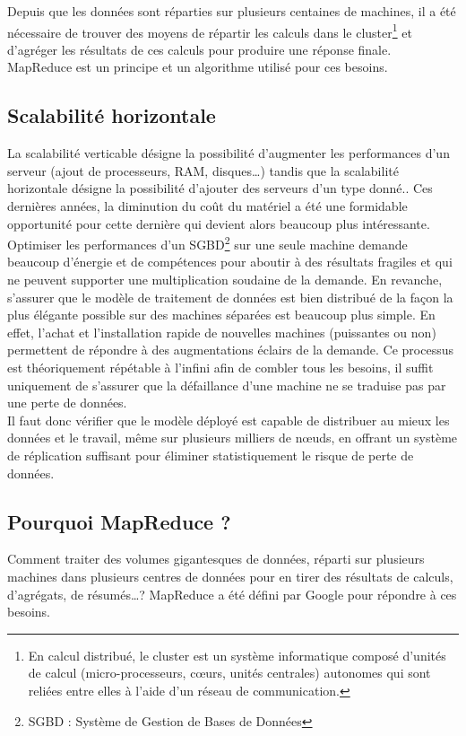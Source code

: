 Depuis que les données sont réparties sur plusieurs centaines de machines, il a été nécessaire de trouver des moyens de répartir les calculs dans le cluster\footnote{En calcul distribué, le cluster est un système informatique composé d'unités de calcul (micro-processeurs, cœurs, unités centrales) autonomes qui sont reliées entre elles à l'aide d'un réseau de communication.\cite{Wikipedia_cluster}} et d'agréger les résultats de ces calculs pour produire une réponse finale. MapReduce est un principe et un algorithme utilisé pour ces besoins.

\subsection*{Scalabilité horizontale}
	La scalabilité verticable désigne la possibilité d'augmenter les performances d'un serveur (ajout de processeurs, RAM, disques\dots) tandis que la scalabilité horizontale désigne la possibilité d'ajouter des serveurs d'un type donné.\cite{Wikipedia_scalabilite}. Ces dernières années, la diminution du coût du matériel a été une formidable opportunité pour cette dernière qui devient alors beaucoup plus intéressante.\\

	Optimiser les performances d'un SGBD\footnote{SGBD : Système de Gestion de Bases de Données} sur une seule machine demande beaucoup d'énergie et de compétences pour aboutir à des résultats fragiles et qui ne peuvent supporter une multiplication soudaine de la demande. En revanche, s'assurer que le modèle de traitement de données est bien distribué de la façon la plus élégante possible sur des machines séparées est beaucoup plus simple. En effet, l'achat et l'installation rapide de nouvelles machines (puissantes ou non) permettent de répondre à des augmentations éclairs de la demande. Ce processus est théoriquement répétable à l'infini afin de combler tous les besoins, il suffit uniquement de s'assurer que la défaillance d'une machine ne se traduise pas par une perte de données.\\

	Il faut donc vérifier que le modèle déployé est capable de distribuer au mieux les données et le travail, même sur plusieurs milliers de nœuds, en offrant un système de réplication suffisant pour éliminer statistiquement le risque de perte de données.

\subsection*{Pourquoi MapReduce ?}
	Comment traiter des volumes gigantesques de données, réparti sur plusieurs machines dans plusieurs centres de données pour en tirer des résultats de calculs, d'agrégats, de résumés\dots ? MapReduce a été défini par Google pour répondre à ces besoins.

